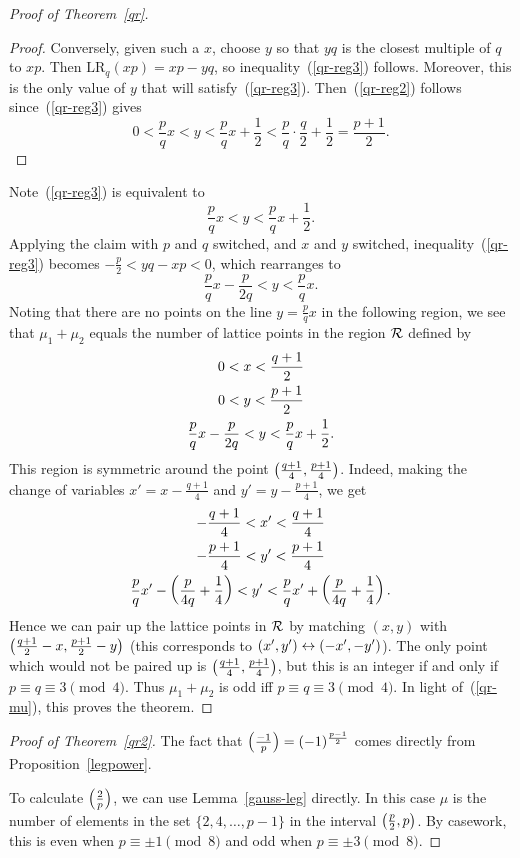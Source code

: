 \begin{proof}[Proof of Theorem~\ref{qr}]
\begin{proof}
Conversely, given such a $x$, choose $y$ so that $yq$ is the closest multiple of $q$ to $xp$. Then $\text{LR}_q(xp)=xp-yq$, so inequality~(\ref{qr-reg3}) follows. Moreover, this is the only value of $y$ that will satisfy~(\ref{qr-reg3}). 
Then~(\ref{qr-reg2}) follows since~(\ref{qr-reg3}) gives 
\[
0<\frac pq x<y<\frac pqx+\frac 12< \frac pq\cdot \frac q2+\frac 12=\frac{p+1}2.
\]
\end{proof}
Note~(\ref{qr-reg3}) is equivalent to
\begin{equation}\label{qr-reg4}
\frac pq x<y<\frac pq x+\frac 1{2}.
\end{equation}
Applying the claim with $p$ and $q$ switched, and $x$ and $y$ switched, inequality~(\ref{qr-reg3}) becomes $-\frac p2<yq-xp<0$, which rearranges to
\begin{equation}\label{qr-reg5}
\frac pq x-\frac p{2q}<y<\frac pq x.
\end{equation}
Noting that there are no points on the line $y=\frac pq x$ in the following region, we see that $\mu_1+\mu_2$ equals the number of lattice points in the region $\cal R$ defined by
\begin{gather}
\nonumber 0<x<\frac{q+1}{2}\\
\label{qr-the-region}0<y<\frac{p+1}{2}\\
\nonumber \frac pq x-\frac p{2q}<y<\frac pqx+\rc 2.
\end{gather}
This region is symmetric around the point $\pa{\frac{q+1}{4},\frac{p+1}4}$. Indeed, making the change of variables $x'=x-\frac{q+1}{4}$ and $y'=y-\frac{p+1}{4}$, we get
\begin{gather*}
-\frac{q+1}{4}<x'<\frac{q+1}{4}\\
-\frac{p+1}{4}<y'<\frac{p+1}{4}\\
\frac pqx'-\pa{\frac p{4q}+\rc4}<y'<\frac pqx'+\pa{\frac p{4q}+\rc4}.
\end{gather*}
Hence we can pair up the lattice points in $\cal R$ by matching $(x,y)$ with $\pa{\frac{q+1}2-x,\frac{p+1}2-y}$ (this corresponds to $(x',y')\lra (-x',-y')$). The only point which would not be paired up is $\pa{\frac{q+1}4,\frac{p+1}4}$, but this is an integer if and only if $p\equiv q\equiv 3\pmod 4$. Thus $\mu_1+\mu_2$ is odd iff $p\equiv q\equiv 3\pmod 4$. In light of~(\ref{qr-mu}), this proves the theorem.
\end{proof}
\begin{proof}[Proof of Theorem~\ref{qr2}]
The fact that $\pf{-1}p=(-1)^{\frac{p-1}{2}}$ comes directly from Proposition~\ref{legpower}.

To calculate $\pf 2p$, we can use Lemma~\ref{gauss-leg} directly. In this case $\mu$ is the number of elements in the set $\{2,4,\ldots, p-1\}$ in the interval $\pa{\frac p2,p}$. By casework, this is even when $p\equiv \pm 1\pmod 8$ and odd when $p\equiv \pm 3\pmod 8$. 
\end{proof}
